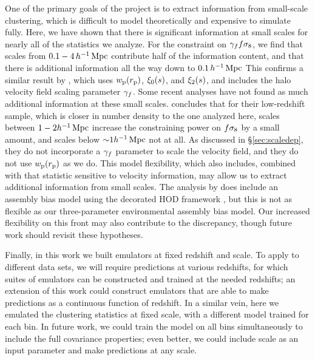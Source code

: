 One of the primary goals of the \aemulus project is to extract information from small-scale clustering, which is difficult to model theoretically and expensive to simulate fully.
Here, we have shown that there is significant information at small scales for nearly all of the statistics we analyze.
For the constraint on $\gamma_f f\sigma_8$, we find that scales from $0.1 - 4 \, h^{-1}\,\mathrm{Mpc}$ contribute half of the information content, and that there is additional information all the way down to $0.1 \, h^{-1}\,\mathrm{Mpc}$
This confirms a similar result by \cite{Zhai2019}, which uses $w_\mathrm{p}(r_\mathrm{p})$, $\xi_0(s)$, and $\xi_2(s)$, and includes the halo velocity field scaling parameter $\gamma_f$. 
Some recent analyses have not found as much additional information at these small scales.
\cite{Lange2022} concludes that for their low-redshift sample, which is closer in number density to the one analyzed here, scales between $1-2 h^{-1}\,\mathrm{Mpc}$ increase the constraining power on $f\sigma_8 $ by a small amount, and scales below $\mathord{\sim}1 h^{-1}\,\mathrm{Mpc}$ not at all.
As discussed in \S\ref{sec:scaledep}, they do not incorporate a $\gamma_f$ parameter to scale the velocity field, and they do not use $w_\mathrm{p}(r_\mathrm{p})$ as we do.
This model flexibility, which \cite{Zhai2019} also includes, combined with that statistic sensitive to velocity information, may allow us to extract additional information from small scales.
The analysis by \cite{Lange2022} does include an assembly bias model using the decorated HOD framework \cite{Hearin2016}, but this is not as flexible as our three-parameter environmental assembly bias model.
Our increased flexibility on this front may also contribute to the discrepancy, though future work should revisit these hypotheses.

Finally, in this work we built emulators at fixed redshift and scale.
To apply to different data sets, we will require predictions at various redshifts, for which suites of emulators can be constructed and trained at the needed redshifts; an extension of this work could construct emulators that are able to make predictions as a continuous function of redshift.
In a similar vein, here we emulated the clustering statistics at fixed scale, with a different model trained for each bin. 
In future work, we could train the model on all bins simultaneously to include the full covariance properties; even better, we could include scale as an input parameter and make predictions at any scale.


\section*{}
 
